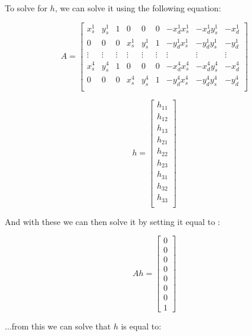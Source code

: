 \documentclass{article}
\begin{document}
To solve for $h$, we can solve it using the following equation:

\begin{equation}
    A = 
    \begin{bmatrix}
        x_s^1 & y_s^1 & 1 & 0 & 0 & 0 & -x_d^1 x_s^1 & -x_d^1 y_s^1 & -x_d^1 \\
        0 & 0 & 0 &  x_s^1 & y_s^1 & 1 & -y_d^1 x_s^1 &-y_d^1 y_s^1 & -y_d^1 \\
        \vdots &\vdots &\vdots &\vdots &\vdots &\vdots &\vdots &\vdots &\vdots \\
        x_s^4 & y_s^4 & 1 & 0 & 0 & 0 & -x_d^4 x_s^4 & -x_d^4 y_s^4 & -x_d^4 \\
        0 & 0 & 0 &  x_s^4 & y_s^4 & 1 & -y_d^4 x_s^4 &-y_d^4 y_s^4 & -y_d^4 \\
    \end{bmatrix}
\end{equation}

\begin{equation}
    h = \begin{bmatrix}
        h_{11} \\
        h_{12} \\
        h_{13} \\
        h_{21} \\
        h_{22} \\
        h_{23} \\
        h_{31} \\
        h_{32} \\
        h_{33} \\
    \end{bmatrix}
\end{equation}

And with these we can then solve it by setting it equal to :

\begin{equation}
    Ah = \begin{bmatrix}
        0 \\ 0 \\ 0 \\ 0 \\ 0 \\ 0 \\ 0 \\ 1
    \end{bmatrix}
\end{equation}

...from this we can solve that $h$ is equal to:
\end{document}
